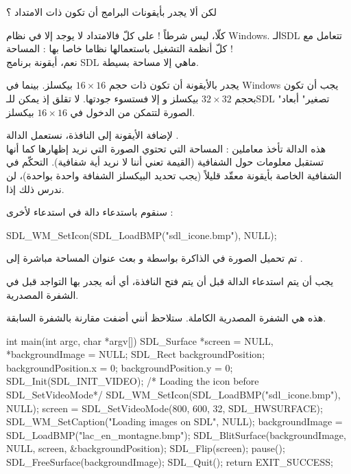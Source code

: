 \begin{question}
لكن ألا يجدر بأيقونات البرامج أن تكون ذات الامتداد
 ؟
\end{question}

كلّا، ليس شرطاً ! على كلّ فالامتداد
لا يوجد إلا في نظام
\textenglish{Windows}.
 الـ\textenglish{SDL}
تتعامل مع كلّ أنظمة التشغيل باستعمالها نظاما خاصا بها : المساحة !\\
نعم، أيقونة برنامج 
\textenglish{SDL}
ماهي إلا مساحة بسيطة.

\begin{warning}
يجدر بالأيقونة أن تكون ذات حجم 
$16 \times 16$
بيكسلز. بينما في 
\textenglish{Windows}
يجب أن تكون بحجم
$32 \times 32$
بيكسلز و إلا فستسوء جودتها. لا تقلق إذ يمكن للـ\textenglish{SDL}
"تصغير" أبعاد الصورة لتتمكن من الدخول في 
$16 \times 16$
بيكسلز.
\end{warning}

لإضافة الأيقونة إلى النافذة، نستعمل الدالة 
.\\
هذه الدالة تأخذ معاملين : المساحة التي تحتوي الصورة التي نريد إظهارها كما أنها تستقبل معلومات حول الشفافية (القيمة 
تعني أننا لا نريد أية شفافية). التحكّم في الشفافية الخاصة بأيقونة معقّد قليلاً (يجب تحديد البيكسلز الشفافة واحدة بواحدة)، لن ندرس ذلك إذا.

سنقوم باستدعاء دالة في استدعاء لأخرى :

\begin{Csource}
SDL_WM_SetIcon(SDL_LoadBMP("sdl_icone.bmp"), NULL);
\end{Csource}
 
تم تحميل الصورة في الذاكرة بواسطة
و بعث عنوان المساحة مباشرة إلى
.

\begin{critical}
يجب أن يتم استدعاء الدالة
قبل أن يتم فتح النافذة، أي أنه يجدر بها التواجد قبل
في الشفرة المصدرية.
\end{critical}

هذه هي الشفرة المصدرية الكاملة. ستلاحظ أنني أضفت
مقارنة بالشفرة السابقة.

\begin{Csource}
int main(int argc, char *argv[])
{
	SDL_Surface *screen = NULL, *backgroundImage = NULL;
	SDL_Rect backgroundPosition;
	backgroundPosition.x = 0;
	backgroundPosition.y = 0;
	SDL_Init(SDL_INIT_VIDEO);
	/* Loading the icon before SDL_SetVideoMode*/
	SDL_WM_SetIcon(SDL_LoadBMP("sdl_icone.bmp"), NULL);
	screen = SDL_SetVideoMode(800, 600, 32, SDL_HWSURFACE);
	SDL_WM_SetCaption("Loading images on SDL", NULL);
	backgroundImage = SDL_LoadBMP("lac_en_montagne.bmp");
	SDL_BlitSurface(backgroundImage, NULL, screen, &backgroundPosition);
	SDL_Flip(screen);
	pause();
	SDL_FreeSurface(backgroundImage);
	SDL_Quit();
	return EXIT_SUCCESS;
}
\end{Csource}

